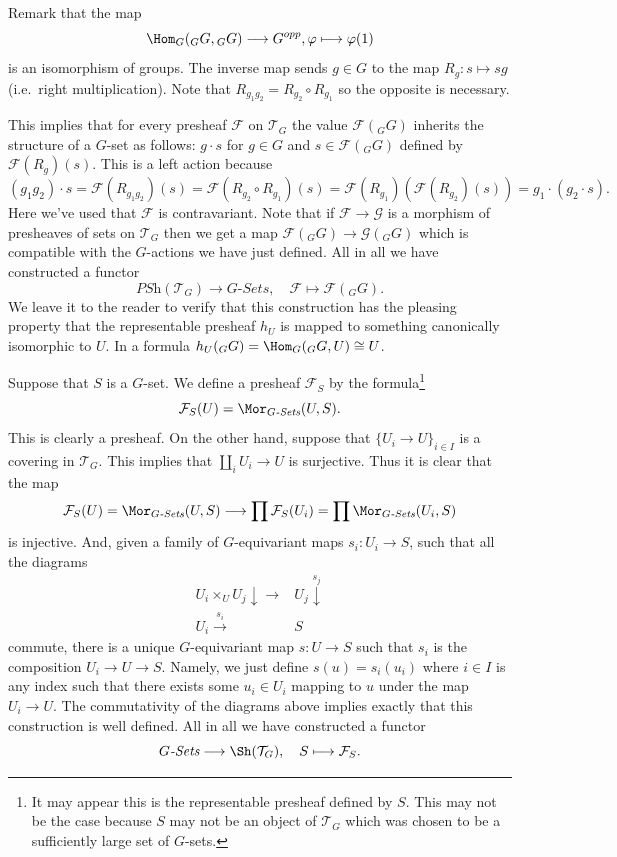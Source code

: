 \medskip\noindent
Remark that the map
$$
\Hom_G({}_GG, {}_GG)
\longrightarrow
G^{opp},
\varphi
\longmapsto
\varphi(1)
$$
is an isomorphism of groups. The inverse map sends $g \in G$
to the map $R_g : s \mapsto sg$ (i.e.\ right multiplication).
Note that $R_{g_1g_2} = R_{g_2} \circ R_{g_1}$ so the opposite
is necessary.

\medskip\noindent
This implies that for every presheaf $\mathcal{F}$ on $\mathcal{T}_G$
the value $\mathcal{F}({}_GG)$ inherits the structure of a $G$-set
as follows: $g \cdot s$ for $g \in G$ and $s \in \mathcal{F}({}_GG)$
defined by $\mathcal{F}(R_g)(s)$. This is a left action
because
$$
(g_1g_2) \cdot s  = \mathcal{F}(R_{g_1g_2})(s) =
\mathcal{F}(R_{g_2}\circ R_{g_1})(s) =
\mathcal{F}(R_{g_1})( \mathcal{F}(R_{g_2})(s)) =
g_1 \cdot (g_2 \cdot s).
$$
Here we've used that $\mathcal{F}$
is contravariant. Note that if $\mathcal{F} \to \mathcal{G}$
is a morphism of presheaves of sets on $\mathcal{T}_G$
then we get a map $\mathcal{F}({}_GG) \to \mathcal{G}({}_GG)$
which is compatible with the $G$-actions we have just defined.
All in all we have constructed a functor
$$
\textit{PSh}(\mathcal{T}_G)
\longrightarrow
G\textit{-Sets}, \quad
\mathcal{F}
\longmapsto
\mathcal{F}({}_GG).
$$
We leave it to the reader to verify that this construction
has the pleasing property that the representable presheaf
$h_U$ is mapped to something canonically isomorphic to $U$.
In a formula $h_U({}_GG) = \Hom_G({}_GG, U) \cong U$.

\medskip\noindent
Suppose that $S$ is a $G$-set. We define a presheaf
$\mathcal{F}_S$ by the formula\footnote{It may appear this is the
representable presheaf defined by $S$. This may not be the case
because $S$ may not be an object of $\mathcal{T}_G$ which was chosen
to be a sufficiently large set of $G$-sets.}
$$
\mathcal{F}_S(U)
=
\Mor_{G\textit{-Sets}}(U, S).
$$
This is clearly a presheaf. On the other hand, suppose that
$\{U_i \to U\}_{i\in I}$ is a covering in $\mathcal{T}_G$.
This implies that $\coprod_i U_i \to U$ is surjective. Thus it is
clear that the map
$$
\mathcal{F}_S(U)
=
\Mor_{G\textit{-Sets}}(U, S)
\longrightarrow
\prod \mathcal{F}_S(U_i)
=
\prod \Mor_{G\textit{-Sets}}(U_i, S)
$$
is injective. And, given a family of $G$-equivariant
maps $s_i : U_i \to S$, such that all the diagrams
$$
\begin{array}{cc}U_i \times_U U_j \downarrow\longrightarrow & U_j \overset{s_j}{\downarrow} \\ U_i \overset{s_i}{\longrightarrow} & S\end{array}
$$
commute, there is a unique $G$-equivariant map
$s : U \to S$ such that $s_i$ is the composition
$U_i \to U \to S$. Namely, we just define $s(u) = s_i(u_i)$
where $i\in I$ is any index such that there exists some
$u_i \in U_i$ mapping to $u$ under the map $U_i \to U$.
The commutativity of the diagrams above implies exactly
that this construction is well defined. All in all we have
constructed a functor
$$
G\textit{-Sets}
\longrightarrow
\Sh(\mathcal{T}_G), \quad
S
\longmapsto
\mathcal{F}_S
.
$$

